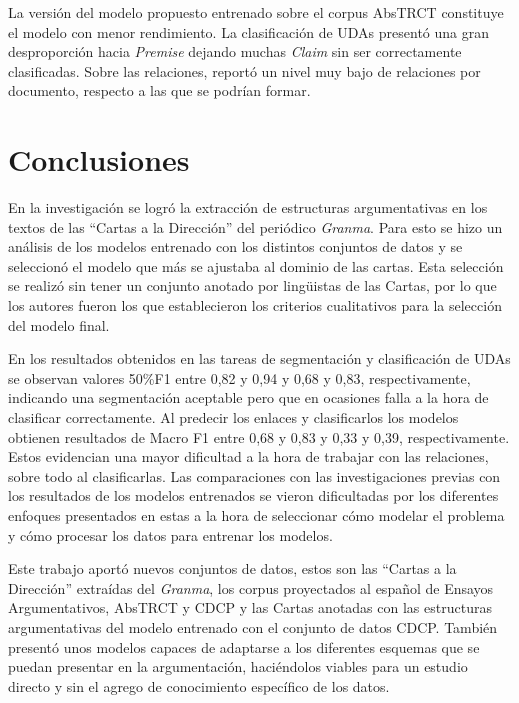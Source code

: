 \documentclass[a4paper,11pt,twocolumn,twoside]{article}
\begin{document}
La versión del modelo propuesto entrenado sobre el corpus AbsTRCT constituye el modelo 
con menor rendimiento. La clasificación
de UDAs presentó una gran desproporción hacia \textit{Premise} dejando muchas \textit{Claim} %
sin ser correctamente clasificadas. Sobre las relaciones, reportó un nivel muy bajo de 
relaciones por documento, respecto a las que se podrían formar.

\section{Conclusiones}

En la investigación se logró la extracción de estructuras argumentativas en los textos de las 
``Cartas a la Dirección'' del periódico \textit{Granma}. Para esto se hizo un análisis de los
modelos entrenado con los distintos conjuntos de datos y se seleccionó el modelo que más se ajustaba
al dominio de las cartas. Esta
selección se realizó sin tener un conjunto anotado por lingüistas de las Cartas,
por lo que los autores fueron los que establecieron los criterios cualitativos 
para la selección del modelo final.

En los resultados obtenidos en las tareas de segmentación y clasificación de UDAs se observan
valores 50\%F1 entre 0,82 y 0,94 y 0,68 y 0,83, respectivamente, indicando una segmentación aceptable 
pero que en ocasiones falla a la hora de clasificar correctamente. Al predecir los enlaces y clasificarlos 
los modelos obtienen resultados de Macro F1 entre 0,68 y 0,83 y 0,33 y 0,39, respectivamente. Estos evidencian
una mayor dificultad a la hora de trabajar con las relaciones, sobre todo al clasificarlas. 
Las comparaciones con las investigaciones previas con los resultados de los modelos entrenados 
se vieron dificultadas por los diferentes enfoques presentados en estas a la hora de seleccionar 
cómo modelar el problema y cómo procesar los datos para entrenar los modelos.

Este trabajo aportó nuevos conjuntos de datos, estos son las ``Cartas a la Dirección'' extraídas del \textit{Granma},
los corpus proyectados al español de Ensayos Argumentativos, AbsTRCT y CDCP y las Cartas 
anotadas con las estructuras argumentativas del modelo entrenado con el conjunto de datos CDCP. También
presentó unos modelos capaces de adaptarse a los diferentes esquemas que se puedan presentar en la argumentación,
haciéndolos viables para un estudio directo y sin el agrego de conocimiento específico de los datos.
\end{document}
